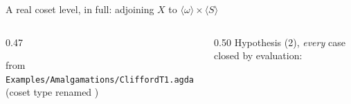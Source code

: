 \begin{frame}{A real coset level, in full: adjoining $X$ to $\langle\omega\rangle\times\langle S\rangle$ \InPaper}
\begin{columns}[T]
\begin{column}{0.47\textwidth}
\begin{code}
\AgdaSymbol{=}\AgdaSpace{}%
\AgdaSpace{}%
\AgdaOperator{\AgdaInductiveConstructor{,}}\AgdaSpace{}%
\<%
\end{code}
{\scriptsize from \texttt{Examples/Amalgamations/CliffordT1.agda} (coset type renamed )}
\end{column}
\begin{column}{0.50\textwidth}
\small Hypothesis (2), \emph{every} case closed by evaluation:
\begin{code}%
%
\>[2]\AgdaSpace{}%
\AgdaSymbol{:}\AgdaSpace{}%
\AgdaSpace{}%
\AgdaSpace{}%
\AgdaSymbol{\{}\AgdaSpace{}%
\AgdaSymbol{\}}\AgdaSpace{}%
\AgdaSpace{}%
\AgdaSpace{}%
\AgdaOperator{\AgdaDatatype{==}}\AgdaSpace{}%
\AgdaSpace{}%
\AgdaSpace{}%
\<%
\\
%
\>[2]\AgdaSpace{}%
\AgdaSpace{}%
\AgdaSpace{}%
\AgdaSymbol{=}\AgdaSpace{}%
\AgdaSpace{}%
\AgdaSpace{}%
\AgdaOperator{\AgdaInductiveConstructor{,}}\AgdaSpace{}%
\<%
\\
%
\>[2]\AgdaSpace{}%
\AgdaSpace{}%
\AgdaSpace{}%
\AgdaSymbol{=}\AgdaSpace{}%
\AgdaSpace{}%
\AgdaSpace{}%
\AgdaOperator{\AgdaInductiveConstructor{,}}\AgdaSpace{}%
\<%
\\
%
\>[2]\AgdaSpace{}%
\AgdaSpace{}%
\AgdaSpace{}%
\AgdaSymbol{=}\AgdaSpace{}%
\AgdaSpace{}%
\AgdaSpace{}%
\AgdaOperator{\AgdaInductiveConstructor{,}}\AgdaSpace{}%
\<%
\\
%
\>[2]\AgdaSpace{}%
\AgdaSpace{}%
\AgdaSpace{}%
\AgdaSymbol{=}\AgdaSpace{}%
\AgdaSpace{}%
\AgdaSpace{}%
\AgdaOperator{\AgdaInductiveConstructor{,}}\AgdaSpace{}%
\<%
\\
%
\>[2]\AgdaSpace{}%
\AgdaSpace{}%

\end{code}
\end{column}
\end{columns}
\end{frame}

